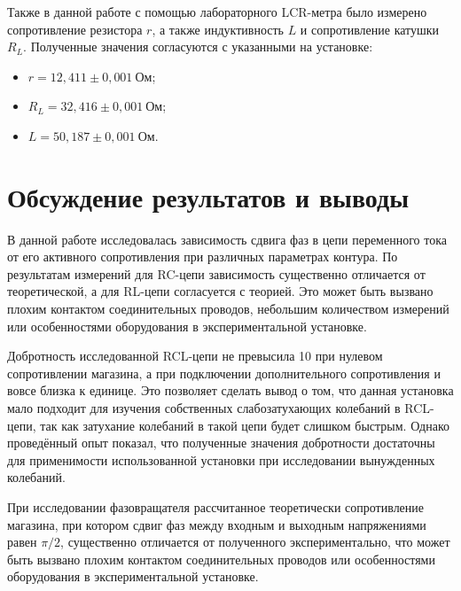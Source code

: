 \documentclass[a4paper, 12pt]{article}
\begin{document}
Также в данной работе с помощью лабораторного LCR-метра было измерено сопротивление резистора $r$, а также индуктивность $L$ и сопротивление катушки $R_L$. Полученные значения согласуются с указанными на установке:
\begin{itemize}
\item $r = 12,411\pm0,001~Ом$;
\item $R_L = 32,416\pm0,001~Ом$;
\item $L = 50,187\pm0,001~Ом$.
\end{itemize}

\section{Обсуждение результатов и выводы}

В данной работе исследовалась зависимость сдвига фаз в цепи переменного тока от его активного сопротивления при различных параметрах контура. По результатам измерений для RC-цепи зависимость существенно отличается от теоретической, а для RL-цепи согласуется с теорией. Это может быть вызвано плохим контактом соединительных проводов, небольшим количеством измерений или особенностями оборудования в экспериментальной установке.

Добротность исследованной RCL-цепи не превысила 10 при нулевом сопротивлении магазина, а при подключении дополнительного сопротивления и вовсе близка к единице. Это позволяет сделать вывод о том, что данная установка мало подходит для изучения собственных слабозатухающих колебаний в RCL-цепи, так как затухание колебаний в такой цепи будет слишком быстрым. Однако проведённый опыт показал, что полученные значения добротности достаточны для применимости использованной установки при исследовании вынужденных колебаний.

При исследовании фазовращателя рассчитанное теоретически сопротивление магазина, при котором сдвиг фаз между входным и выходным напряжениями равен $\pi/2$, существенно отличается от полученного экспериментально, что может быть вызвано плохим контактом соединительных проводов или особенностями оборудования в экспериментальной установке.
\end{document}
